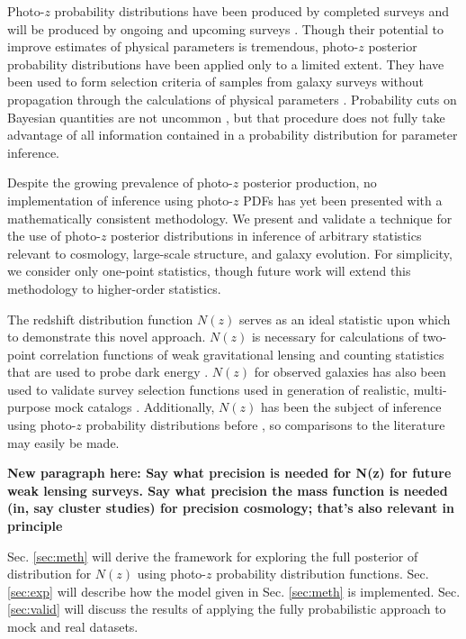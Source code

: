 \documentclass[preprint]{aastex}
\begin{document}
Photo-$z$ probability distributions have been produced by completed surveys 
\citep{Hildebrandt2012, Sheldon2012} and will be produced by ongoing and 
upcoming surveys \citep{LSSTScienceCollaboration2009, CarrascoKind2014a, 
Bonnett2015, Masters2015}.  Though their potential to improve estimates of 
physical parameters is tremendous, photo-$z$ posterior probability 
distributions have been applied only to a limited extent.  They have been used 
to form selection criteria of samples from galaxy surveys without propagation 
through the calculations of physical parameters 
\citep{VanBreukelen2009,Viironen2015}.  Probability cuts on Bayesian quantities 
are not uncommon \citep{Leung2015, DiPompeo2015a}, but that procedure does not 
fully take advantage of all information contained in a probability distribution 
for parameter inference.  

Despite the growing prevalence of photo-$z$ posterior production, no 
implementation of inference using photo-$z$ PDFs has yet been presented with a 
mathematically consistent methodology.  We present and validate a technique for 
the use of photo-$z$ posterior distributions in inference of arbitrary 
statistics relevant to cosmology, large-scale structure, and galaxy evolution.  
For simplicity, we consider only one-point statistics, though future work will 
extend this methodology to higher-order statistics.

The redshift distribution function $N(z)$ serves as an ideal statistic upon 
which to demonstrate this novel approach.  $N(z)$ is necessary for calculations 
of two-point correlation functions of weak gravitational lensing and counting 
statistics that are used to probe dark energy \citep{Masters2015}.  $N(z)$ for 
observed galaxies has also been used to validate survey selection functions 
used in generation of realistic, multi-purpose mock catalogs 
\citep{Norberg2002}.  Additionally, $N(z)$ has been the subject of inference 
using photo-$z$ probability distributions before \citep{Sheldon2012, 
Hildebrandt2012, Kelly2014, Benjamin2013, Bonnett2015a, Viironen2015, 
Asorey2016, Leistedt2016}, so comparisons to the literature may easily be made. 
 

\textbf{New paragraph here: Say what precision is needed for N(z) for future 
weak lensing surveys. Say what precision the mass function is needed (in, say 
cluster studies) for precision cosmology; that's also relevant in principle}

Sec. \ref{sec:meth} will derive the framework for exploring the full posterior 
of distribution for $N(z)$ using photo-$z$ probability distribution functions.  
Sec. \ref{sec:exp} will describe how the model given in Sec. \ref{sec:meth} is 
implemented.  Sec. \ref{sec:valid} will discuss the results of applying the 
fully probabilistic approach to mock and real datasets.
\end{document}
